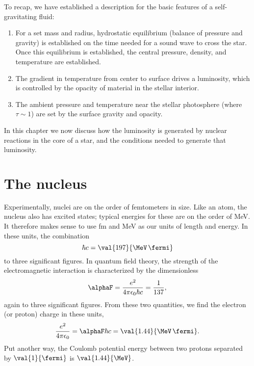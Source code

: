 
To recap, we have established a description for the basic features of a self-gravitating fluid:
\begin{enumerate}

\item For a set mass and radius, hydrostatic equilibrium (balance of pressure and gravity) is established on the time needed for a sound wave to cross the star. Once this equilibrium is established, the central pressure, density, and temperature are established.

\item The gradient in temperature from center to surface drives a luminosity, which is controlled by the opacity of material in the stellar interior.

\item The ambient pressure and temperature near the stellar photosphere (where $\tau \sim 1$) are set by the surface gravity and opacity.

\end{enumerate}

In this chapter we now discuss how the luminosity is generated by nuclear reactions in the core of a star, and the conditions needed to generate that luminosity.

\section{The nucleus}

Experimentally, nuclei are on the order of femtometers in size. Like an atom, the nucleus also has excited states; typical energies for these are on the order of MeV. It therefore makes sense to use fm and MeV as our units of length and energy. In these units, the combination
\[	\hbar c = \val{197}{\MeV\,\fermi} \]
to three significant figures. In quantum field theory, the strength of the electromagnetic interaction is characterized by the dimensionless 
\[	\alphaF = \frac{e^{2}}{4\pi\epsilon_{0}\hbar c} = \frac{1}{137}, \]
again to three significant figures. From these two quantities, we find the electron (or proton) charge in these units,
\[
	\frac{e^{2}}{4\pi\epsilon_{0}} = \alphaF\hbar c = \val{1.44}{\MeV\,\fermi}.
\]
Put another way, the Coulomb potential energy between two protons separated by $\val{1}{\fermi}$ is $\val{1.44}{\MeV}$.

